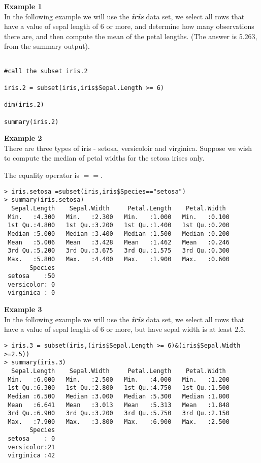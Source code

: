 \documentclass[a4paper,12pt]{article}
\begin{document}
\noindent \textbf{Example 1} \\
In the following example we will use the \textit{\textbf{iris}} data set, we select all rows that have a value of sepal length of 6 or more, and determine how many observations there are, and then compute the mean of the petal lengths. (The answer is 5.263, from the summary output).

\begin{framed}
\begin{verbatim}

#call the subset iris.2

iris.2 = subset(iris,iris$Sepal.Length >= 6)

dim(iris.2)

summary(iris.2)

\end{verbatim}
\end{framed}

\noindent \textbf{Example 2} \\
There are three types of iris - setosa, versicoloir and virginica. Suppose we wish to compute the median of petal widths for the setosa irises only.

The equality operator is $==$.
\begin{verbatim}
> iris.setosa =subset(iris,iris$Species=="setosa")
> summary(iris.setosa)
  Sepal.Length    Sepal.Width     Petal.Length    Petal.Width   
 Min.   :4.300   Min.   :2.300   Min.   :1.000   Min.   :0.100  
 1st Qu.:4.800   1st Qu.:3.200   1st Qu.:1.400   1st Qu.:0.200  
 Median :5.000   Median :3.400   Median :1.500   Median :0.200  
 Mean   :5.006   Mean   :3.428   Mean   :1.462   Mean   :0.246  
 3rd Qu.:5.200   3rd Qu.:3.675   3rd Qu.:1.575   3rd Qu.:0.300  
 Max.   :5.800   Max.   :4.400   Max.   :1.900   Max.   :0.600  
       Species  
 setosa    :50  
 versicolor: 0  
 virginica : 0 
\end{verbatim} 
 
\noindent \textbf{Example 3} \\
In the following example we will use the \textit{\textbf{iris}} data set, we select all rows that have a value of sepal length of 6 or more, but have sepal width is at least 2.5.

\begin{verbatim}
> iris.3 = subset(iris,(iris$Sepal.Length >= 6)&(iris$Sepal.Width >=2.5))
> summary(iris.3)
  Sepal.Length    Sepal.Width     Petal.Length    Petal.Width   
 Min.   :6.000   Min.   :2.500   Min.   :4.000   Min.   :1.200  
 1st Qu.:6.300   1st Qu.:2.800   1st Qu.:4.750   1st Qu.:1.500  
 Median :6.500   Median :3.000   Median :5.300   Median :1.800  
 Mean   :6.641   Mean   :3.013   Mean   :5.313   Mean   :1.848  
 3rd Qu.:6.900   3rd Qu.:3.200   3rd Qu.:5.750   3rd Qu.:2.150  
 Max.   :7.900   Max.   :3.800   Max.   :6.900   Max.   :2.500  
       Species  
 setosa    : 0  
 versicolor:21  
 virginica :42  
\end{verbatim}


\end{document}
